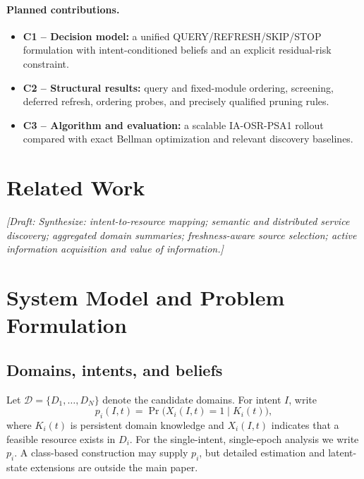 \documentclass[conference]{IEEEtran}
\newcommand{\QUERY}{\textsf{QUERY}}
\newcommand{\REFRESH}{\textsf{REFRESH}}
\newcommand{\SKIP}{\textsf{SKIP}}
\newcommand{\STOP}{\textsf{STOP}}
\newcommand{\TODO}[1]{\textit{[Draft: #1]}}
\begin{document}
\paragraph{Planned contributions.}
\begin{itemize}
\item \textbf{C1 -- Decision model:} a unified \QUERY/\REFRESH/\SKIP/\STOP
formulation with intent-conditioned beliefs and an explicit
residual-risk constraint.
\item \textbf{C2 -- Structural results:} query and fixed-module ordering,
screening, deferred refresh, ordering probes, and precisely qualified
pruning rules.
\item \textbf{C3 -- Algorithm and evaluation:} a scalable
IA-OSR-PSA1 rollout compared with exact Bellman optimization and
relevant discovery baselines.
\end{itemize}

\section{Related Work}
\label{sec:related}
\TODO{Synthesize: intent-to-resource mapping; semantic and distributed
service discovery; aggregated domain summaries; freshness-aware source
selection; active information acquisition and value of information.}


\section{System Model and Problem Formulation}
\label{sec:model}
\subsection{Domains, intents, and beliefs}
Let $\mathcal D=\{D_1,\ldots,D_N\}$ denote the candidate domains.
For intent $I$, write
\begin{equation}
 p_i(I,t)=\Pr\bigl(X_i(I,t)=1\mid K_i(t)\bigr),
 \label{eq:belief}
\end{equation}
where $K_i(t)$ is persistent domain knowledge and $X_i(I,t)$ indicates
that a feasible resource exists in $D_i$. For the single-intent,
single-epoch analysis we write $p_i$. A class-based construction may
supply $p_i$, but detailed estimation and latent-state extensions are
outside the main paper.
\end{document}
